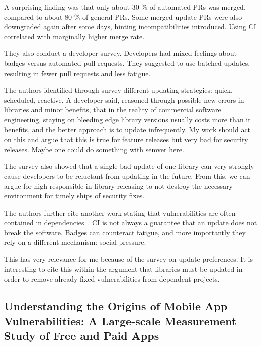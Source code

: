 A surprising finding was that only about 30 \% of automated PRs was merged, compared to about 80 \% of general PRs.
Some merged update PRs were also downgraded again after some days, hinting incompatibilities introduced.
Using CI correlated with marginally higher merge rate.

They also conduct a developer survey.
Developers had mixed feelings about badges versus automated pull requests.
They suggested to use batched updates, resulting in fewer pull requests and less fatigue.

The authors identified through survey different updating strategies: quick, scheduled, reactive.
A developer said, reasoned through possible new errors in libraries and minor benefits, that in the reality of commercial
software engineering, staying on bleeding edge library versions usually costs more than it benefits, and the better
approach is to update infrequently.
My work should act on this and argue that this is true for feature releases but very bad for security releases.
Maybe one could do something with semver here.

The survey also showed that a single bad update of one library can very strongly cause developers to be reluctant from
updating in the future.
From this, we can argue for high responsible in library releasing to not destroy the necessary environment for timely
ships of security fixes.

The authors further cite another work stating that vulnerabilities are often contained in dependencies~\cite{xia2014}.
CI is not always a guarantee that an update does not break the software.
Badges can counteract fatigue, and more importantly they rely on a different mechanism: social pressure.

This has very relevance for me because of the survey on update preferences.
It is interesting to cite this within the argument that libraries must be updated in order to remove already fixed
vulnerabilities from dependent projects.



\subsection{Understanding the Origins of Mobile App Vulnerabilities: A Large-scale Measurement Study of Free and Paid Apps}
\label{subsec:understanding-the-origins-of-mobile-app-vulnerabilities:-a-large-scale-measurement-study-of-free-and-paid-apps}

